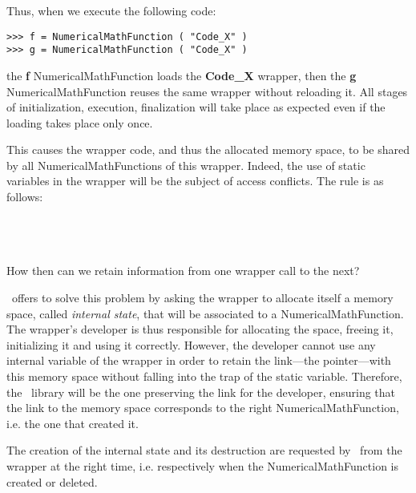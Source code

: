 Thus, when we execute the following code:

\lstset{language=C++, basicstyle=\normalsize}
\begin{lstlisting}[frame=TBRL]
>>> f = NumericalMathFunction ( "Code_X" )
>>> g = NumericalMathFunction ( "Code_X" )
\end{lstlisting}

the {\bf f} NumericalMathFunction loads the {\bf Code\_X} wrapper, then the {\bf g} NumericalMathFunction reuses the same wrapper without reloading it. All stages of initialization, execution, finalization will take place as expected even if the loading takes place only once.

This causes the wrapper code, and thus the allocated memory space, to be shared by all NumericalMathFunctions of this wrapper. Indeed, the use of static variables in the wrapper will be the subject of access conflicts. The rule is as follows:

\ \\
\ \\
\ \\

How then can we retain information from one wrapper call to the next?

\OT\ offers to solve this problem by asking the wrapper to allocate itself a memory space, called \emph{internal state}, that will be associated to a NumericalMathFunction. The wrapper's developer is thus responsible for allocating the space, freeing it, initializing it and using it correctly. However, the developer cannot use any internal variable of the wrapper in order to retain the link---the pointer---with this memory space without falling into the trap of the static variable. Therefore, the \OT\ library will be the one preserving the link for the developer, ensuring that the link to the memory space corresponds to the right NumericalMathFunction, i.e. the one that created it.

The creation of the internal state and its destruction are requested by \OT\ from the wrapper at the right time, i.e. respectively when the NumericalMathFunction is created or deleted.

